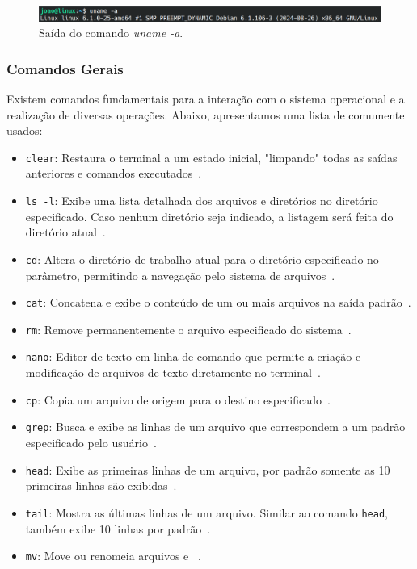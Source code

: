 \documentclass[
	12pt,				%
	oneside,   	        %
	a4paper,			%
	english,			%
	french,				%
	spanish,			%
	brazil,				%
	]{pacotes/abntex2}
\begin{document}
\begin{figure}[H]
  \centering
  \includegraphics[scale=0.43]{figuras/uname.png}
  \caption{Saída do comando \textit{uname -a}.}
  \label{fig:uname}
\end{figure}

\subsubsection{Comandos Gerais}
Existem comandos fundamentais para a interação com o sistema operacional e a realização de diversas operações. Abaixo, apresentamos uma lista de comumente usados:

\begin{itemize}
    \item \texttt{clear}: Restaura o terminal a um estado inicial, "limpando" todas as saídas anteriores e comandos executados~\cite{manClear}.

    \item \texttt{ls -l}: Exibe uma lista detalhada dos arquivos e diretórios no diretório especificado. Caso nenhum diretório seja indicado, a listagem será feita do diretório atual~\cite{manLs}.

    \item \texttt{cd}: Altera o diretório de trabalho atual para o diretório especificado no parâmetro, permitindo a navegação pelo sistema de arquivos~\cite{manCd}.

    \item \texttt{cat}: Concatena e exibe o conteúdo de um ou mais arquivos na saída padrão~\cite{manCat}.

    \item \texttt{rm}: Remove permanentemente o arquivo especificado do sistema~\cite{manRm}.

    \item \texttt{nano}: Editor de texto em linha de comando que permite a criação e modificação de arquivos de texto diretamente no terminal~\cite{archNano}.

    \item \texttt{cp}: Copia um arquivo de origem para o destino especificado~\cite{manCp}.

    \item \texttt{grep}: Busca e exibe as linhas de um arquivo que correspondem a um padrão especificado pelo usuário~\cite{manGrep}.

    \item \texttt{head}: Exibe as primeiras linhas de um arquivo, por padrão somente as 10 primeiras linhas são exibidas~\cite{manHead}. 

    \item \texttt{tail}: Mostra as últimas linhas de um arquivo. Similar ao comando \texttt{head}, também exibe 10 linhas por padrão~\cite{manTail}.

    \item \texttt{mv}: Move ou renomeia arquivos e ~\cite{manMv}. 
\end{itemize}
\end{document}
